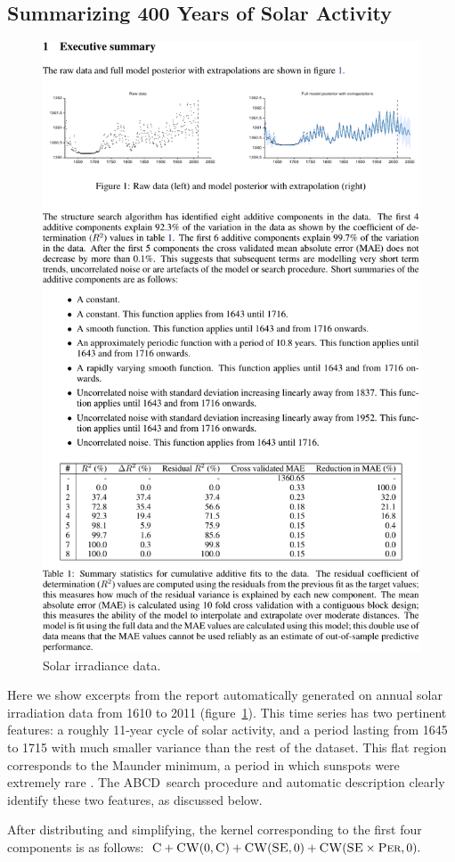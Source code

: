 \documentclass[letterpaper]{article}
\let\emptyset 0
\newcommand{\procedurename}{ABCD\ }
\begin{document}
\subsection{Summarizing 400 Years of Solar Activity}
\label{sec:solar}

\begin{figure}[h]
\centering
\includegraphics[trim=0.2cm 18.0cm 8cm 2cm, clip, width=0.98\columnwidth, height=0.45\columnwidth]{solarpages/pg_0002-crop}
\caption{
Solar irradiance data.}
\label{fig:solar}
\end{figure}

Here we show excerpts from the report automatically generated on annual solar irradiation data from 1610 to 2011 (figure~\ref{fig:solar}).
This time series has two pertinent features: a roughly 11-year cycle of solar activity, and a period lasting from 1645 to 1715 with much smaller variance than the rest of the dataset.  This flat region corresponds to the Maunder minimum, a period in which sunspots were extremely rare \citep{lean1995reconstruction}.
The \procedurename search procedure and automatic description clearly identify these two features, as discussed below.

After distributing and simplifying, the kernel corresponding to the first four components is as follows:
$\kC + \kCW(\emptyset,\kC) + \kCW(\kSE,\emptyset) + \kCW(\kSE \times \kPer,\emptyset).$
\end{document}
